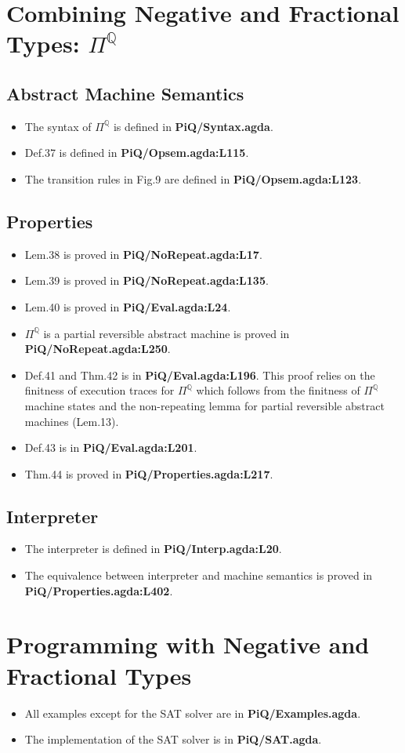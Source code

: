 \documentclass{article}
\begin{document}
\section{Combining Negative and Fractional Types: $\Pi^{\mathbb{Q}}$}
\subsection{Abstract Machine Semantics}
\begin{itemize}
\item The syntax of $\Pi^{\mathbb{Q}}$ is defined in \textbf{PiQ/Syntax.agda}.
\item Def.37 is defined in \textbf{PiQ/Opsem.agda:L115}.
\item The transition rules in Fig.9 are defined in \textbf{PiQ/Opsem.agda:L123}.
\end{itemize}

\subsection{Properties}
\begin{itemize}
\item Lem.38 is proved in \textbf{PiQ/NoRepeat.agda:L17}.
\item Lem.39 is proved in \textbf{PiQ/NoRepeat.agda:L135}.
\item Lem.40 is proved in \textbf{PiQ/Eval.agda:L24}.
\item $\Pi^{\mathbb{Q}}$ is a partial reversible abstract machine is proved in \textbf{PiQ/NoRepeat.agda:L250}.
\item Def.41 and Thm.42 is in \textbf{PiQ/Eval.agda:L196}. This proof relies on the finitness of execution traces
  for $\Pi^{\mathbb{Q}}$ which follows from the finitness of
  $\Pi^{\mathbb{Q}}$ machine states and the non-repeating lemma for partial
  reversible abstract machines (Lem.13).
\item Def.43 is in \textbf{PiQ/Eval.agda:L201}.
\item Thm.44 is proved in \textbf{PiQ/Properties.agda:L217}.
\end{itemize}

\subsection{Interpreter}
\begin{itemize}
\item The interpreter is defined in \textbf{PiQ/Interp.agda:L20}.
\item The equivalence between interpreter and machine semantics is proved in \textbf{PiQ/Properties.agda:L402}.
\end{itemize}

\section{Programming with Negative and Fractional Types}
\begin{itemize}
\item All examples except for the SAT solver are in \textbf{PiQ/Examples.agda}.
\item The implementation of the SAT solver is in \textbf{PiQ/SAT.agda}.
\end{itemize}
\end{document}
